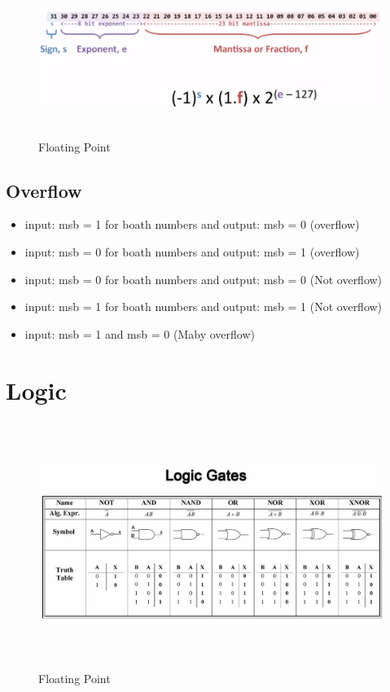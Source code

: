 \documentclass{article}
\begin{document}
\begin{figure}[h]
    \vspace{10mm}
    \centering
    \includegraphics[width=16cm, height=5cm]{image/floating-point.png} 
    \caption{Floating Point}
    \label{floating-point}
\end{figure}

\subsection{Overflow}
\begin{itemize}
\item  input: msb = 1 for boath numbers and output: msb = 0 (overflow)
\item  input: msb = 0 for boath numbers and output: msb = 1 (overflow)
\item  input: msb = 0 for boath numbers and output: msb = 0 (Not overflow)
\item  input: msb = 1 for boath numbers and output: msb = 1 (Not overflow)
\item  input: msb = 1 and msb = 0 (Maby overflow)
\end{itemize}


\newpage

\section{Logic}

\begin{figure}[h]
    \vspace{10mm}
    \centering
    \includegraphics[width=16cm, height=8cm]{image/logic-gates.jpeg} 
    \caption{Floating Point}
    \label{logic-gates}
\end{figure}
\end{document}

